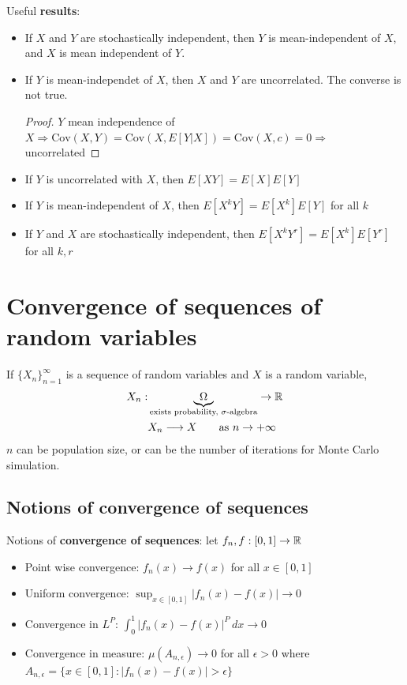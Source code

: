 Useful \textbf{results}:
\begin{itemize}
    \item If $X$ and $Y$ are stochastically independent, then $Y$ is mean-independent of $X$, and $X$ is mean independent of $Y$.
    \item If $Y$ is mean-independet of $X$, then $X$ and $Y$ are uncorrelated. The converse is not true.
        \begin{proof}
            $Y$ mean independence of $X \Rightarrow \text{Cov}(X,Y) = \text{Cov}(X, E[Y|X]) = \text{Cov}(X,c) = 0\Rightarrow$ uncorrelated
        \end{proof}
    \item If $Y$ is uncorrelated with $X$, then $E[XY] = E[X]E[Y]$
    \item If $Y$ is mean-independent of $X$, then $E[X^k Y]=E[X^k]E[Y]$ for all $k$
    \item If $Y$ and $X$ are stochastically independent, then $E[X^k Y^r] = E[X^k]E[Y^r]$ for all $k,r$
\end{itemize}

\section{Convergence of sequences of random variables}

If $\{X_n\}_{n=1}^{\infty}$ is a sequence of random variables and $X$ is a random variable,
\begin{equation*}
    \begin{split}
        X_n : &\underbrace{\Omega}_{\text{exists probability, $\sigma$-algebra}}\to\mathbb{R}\\
        &X_n\longrightarrow X \qquad \text{as } n\rightarrow +\infty
    \end{split}     
\end{equation*}
$n$ can be population size, or can be the number of iterations for Monte Carlo simulation.

\subsection{Notions of convergence of sequences}

Notions of \textbf{convergence of sequences}: let $f_n, f : [0,1]\to\mathbb{R}$
    \begin{itemize}
        \item Point wise convergence: $f_n(x)\to f(x)$ for all $x\in[0,1]$
        \item Uniform convergence: $\displaystyle\sup_{x\in[0,1]}|f_n(x)-f(x)|\to 0$
        \item Convergence in $L^P$: $\displaystyle\int_{0}^{1}|f_n(x)-f(x)|^P\, dx\to 0$
        \item Convergence in measure: $\mu(A_{n,\epsilon})\to 0$ for all $\epsilon>0$ where $A_{n,\epsilon}=\{x\in[0,1] : |f_n(x)-f(x)|>\epsilon\}$
    \end{itemize}

